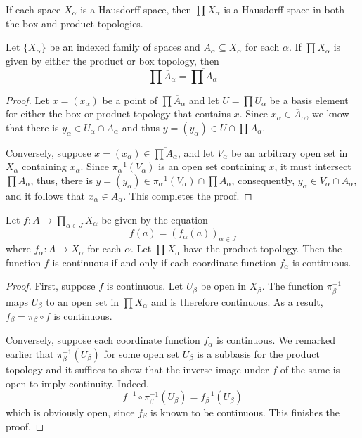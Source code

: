\begin{theorem}
    If each space $X_\alpha$ is a Hausdorff space, then $\prod X_\alpha$ is a Hausdorff space in both the box and product topologies.
\end{theorem}

\begin{theorem}
    Let $\{X_\alpha\}$ be an indexed family of spaces and $A_\alpha\subseteq X_\alpha$ for each $\alpha$. If $\prod X_\alpha$ is given by either the product or box topology, then 
    \begin{equation*}
        \prod\overline{A}_\alpha = \overline{\prod A_\alpha}
    \end{equation*}
\end{theorem}
\begin{proof}
    Let $x = (x_\alpha)$ be a point of $\prod\overline{A}_\alpha$ and let $U = \prod U_\alpha$ be a basis element for either the box or product topology that contains $x$. Since $x_\alpha\in\overline{A}_\alpha$, we know that there is $y_\alpha\in U_\alpha\cap A_\alpha$ and thus $y = (y_\alpha)\in U\cap\prod A_\alpha$.

    Conversely, suppose $x = (x_\alpha)\in\overline{\prod A_\alpha}$, and let $V_\alpha$ be an arbitrary open set in $X_\alpha$ containing $x_\alpha$. Since $\pi_\alpha^{-1}(V_\alpha)$ is an open set containing $x$, it must intersect $\prod A_\alpha$, thus, there is $y = (y_\alpha)\in\pi_\alpha^{-1}(V_\alpha)\cap\prod A_\alpha$, consequently, $y_\alpha\in V_\alpha\cap A_\alpha$, and it follows that $x_\alpha\in\overline{A_\alpha}$. This completes the proof.
\end{proof}

\begin{theorem}
    Let $f:A\to\prod_{\alpha\in J}X_\alpha$ be given by the equation 
    \begin{equation*}
        f(a) = (f_\alpha(a))_{\alpha\in J}
    \end{equation*}
    where $f_\alpha:A\to X_\alpha$ for each $\alpha$. Let $\prod X_\alpha$ have the product topology. Then the function $f$ is continuous if and only if each coordinate function $f_\alpha$ is continuous.
\end{theorem}
\begin{proof}
    First, suppose $f$ is continuous. Let $U_\beta$ be open in $X_\beta$. The function $\pi^{-1}_\beta$ maps $U_\beta$ to an open set in $\prod X_\alpha$ and is therefore continuous. As a result, $f_\beta = \pi_\beta\circ f$ is continuous.

    Conversely, suppose each coordinate function $f_\alpha$ is continuous. We remarked earlier that $\pi_\beta^{-1}(U_\beta)$ for some open set $U_\beta$ is a subbasis for the product topology and it suffices to show that the inverse image under $f$ of the same is open to imply continuity. Indeed, 
    \begin{equation*}
        f^{-1}\circ\pi^{-1}_\beta(U_\beta) = f_\beta^{-1}(U_\beta)
    \end{equation*}
    which is obviously open, since $f_\beta$ is known to be continuous. This finishes the proof.
\end{proof}

